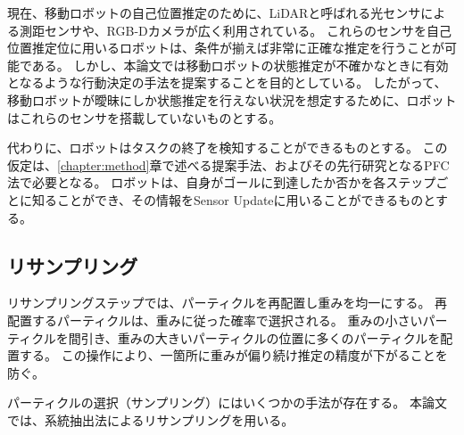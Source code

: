 現在、移動ロボットの自己位置推定のために、LiDARと呼ばれる光センサによる測距センサや、RGB-Dカメラが広く利用されている。
これらのセンサを自己位置推定位に用いるロボットは、条件が揃えば非常に正確な推定を行うことが可能である。
しかし、本論文では移動ロボットの状態推定が不確かなときに有効となるような行動決定の手法を提案することを目的としている。
したがって、移動ロボットが曖昧にしか状態推定を行えない状況を想定するために、ロボットはこれらのセンサを搭載していないものとする。

代わりに、ロボットはタスクの終了を検知することができるものとする。
この仮定は、\ref{chapter:method}章で述べる提案手法、およびその先行研究となるPFC法で必要となる。
ロボットは、自身がゴールに到達したか否かを各ステップごとに知ることができ、その情報をSensor Updateに用いることができるものとする。

\subsection{リサンプリング}
リサンプリングステップでは、パーティクルを再配置し重みを均一にする。
再配置するパーティクルは、重みに従った確率で選択される。
重みの小さいパーティクルを間引き、重みの大きいパーティクルの位置に多くのパーティクルを配置する。
この操作により、一箇所に重みが偏り続け推定の精度が下がることを防ぐ。

パーティクルの選択（サンプリング）にはいくつかの手法が存在する。
本論文では、系統抽出法によるリサンプリングを用いる。
